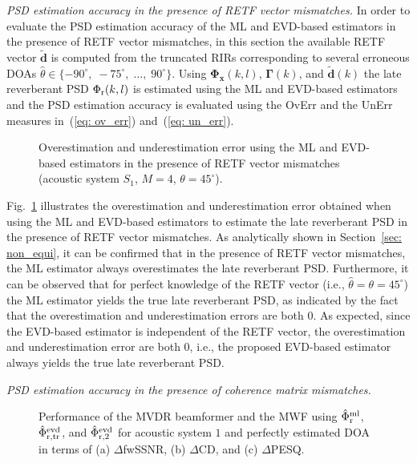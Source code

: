 \documentclass[10pt]{IEEEtran}
\begin{document}
{\emph{PSD estimation accuracy in the presence of RETF vector mismatches.}} \enspace
In order to evaluate the PSD estimation accuracy of the ML and EVD-based estimators in the presence of RETF vector mismatches, in this section the available RETF vector $\tilde{\mathbf{d}}$ is computed from the truncated RIRs corresponding to several erroneous DOAs $\hat{\theta} \in \{-90^{\circ}, \; -75^{\circ}, \; \ldots, \; 90^{\circ} \}$.
Using $\mathbf{\Phi}_{\mathbf{x}}(k,l)$, $\boldsymbol{\Gamma}(k)$, and $\tilde{\mathbf{d}}(k)$ the late reverberant PSD $\Phi_{\rm r}(k,l)$ is estimated using the ML and EVD-based estimators and the PSD estimation accuracy is evaluated using the OvErr and the UnErr measures in~(\ref{eq: ov_err}) and~(\ref{eq: un_err}).
\begin{figure}[t]
\centering

\caption{Overestimation and underestimation error using the ML and EVD-based estimators in the presence of RETF vector mismatches (acoustic system $S_1$, $M = 4$, $\theta = 45^{\circ}$).}
\label{fig: error_ml_retf}
\end{figure}
Fig.~\ref{fig: error_ml_retf} illustrates the overestimation and underestimation error obtained when using the ML and EVD-based estimators to estimate the late reverberant PSD in the presence of RETF vector mismatches.
As analytically shown in Section~\ref{sec: non_equi}, it can be confirmed that in the presence of RETF vector mismatches, the ML estimator always overestimates the late reverberant PSD.
Furthermore, it can be observed that for perfect knowledge of the RETF vector (i.e., $\hat{\theta} = \theta = 45^{\circ}$) the ML estimator yields the true late reverberant PSD, as indicated by the fact that the overestimation and underestimation errors are both $0$.
As expected, since the EVD-based estimator is independent of the RETF vector, the overestimation and underestimation error are both $0$, i.e., the proposed EVD-based estimator always yields the true late reverberant PSD.

{\emph{PSD estimation accuracy in the presence of coherence matrix mismatches.}} \enspace

\begin{figure*}[t!]
    \centering
    \subfloat[]{}
    \subfloat[]{}
    \caption{Performance of the MVDR beamformer and the MWF using $\hat{\Phi}^{\rm ml}_{\rm r}$, $\hat{\Phi}^{\rm evd}_{\rm r,tr}$, and $\hat{\Phi}^{\rm evd}_{\rm r,2}$ for acoustic system $1$ and perfectly estimated DOA in terms of (a) $\Delta$fwSSNR, (b) $\Delta$CD, and (c) $\Delta$PESQ.}
    \label{fig: error_cohmis}
\end{figure*}
\end{document}
